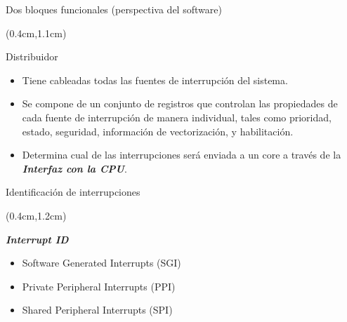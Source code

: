 \documentclass[table,x11names,aspectratio=169]{beamer}
\begin{document}
\begin{frame}[t]{Dos bloques funcionales (perspectiva del software)}
 \begin{textblock*}{\textwidth}(0.4cm,1.1cm)
  \begin{block}{Distribuidor}
   \begin{itemize}[<+(1)->]\justifying
    \item Tiene cableadas todas las fuentes de interrupción del sistema. 
    \item Se compone de un conjunto de registros que controlan las propiedades de cada fuente de interrupción de manera individual, tales como prioridad, estado, seguridad, información de vectorización, y habilitación.
    \item Determina cual de las interrupciones será enviada a un core a través de la \textbf{\textit{Interfaz con la CPU}}.  
   \end{itemize}
  \end{block}
 \end{textblock*}
\end{frame}

\begin{frame}[t]{Identificación de interrupciones}
 \begin{textblock*}{\textwidth}(0.4cm,1.2cm)
  \begin{block}{\textbf{\textit{Interrupt ID}}}\justifying
   
   
  \end{block}
  \parskip 0.3cm
  \begin{itemize}[<+(5)->]\parskip 0.3cm
   \item Software Generated Interrupts (SGI)
   \item Private Peripheral Interrupts (PPI)
   \item Shared Peripheral Interrupts (SPI)
  \end{itemize}
 \end{textblock*}
\end{frame}
\end{document}
